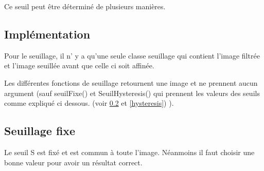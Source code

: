 \documentclass[11pt]{article}
\begin{document}
	Ce seuil peut être déterminé de plusieurs manières.

	\subsection{Implémentation}

	Pour le seuillage, il n' y a qu'une seule classe seuillage qui contient l'image filtrée et l'image seuillée avant que celle ci soit affinée.

	Les différentes fonctions de seuillage retournent une image et ne prennent aucun argument (sauf seuilFixe() et SeuilHysteresis() qui prennent les valeurs des seuils comme expliqué ci dessous. (voir \ref{fixe} et \ref{hysteresis}) ).

	\subsection{Seuillage fixe}\label{fixe}

	Le seuil S est fixé et est commun à toute l'image. Néanmoins il faut choisir une bonne valeur pour avoir un résultat correct.
\end{document}
